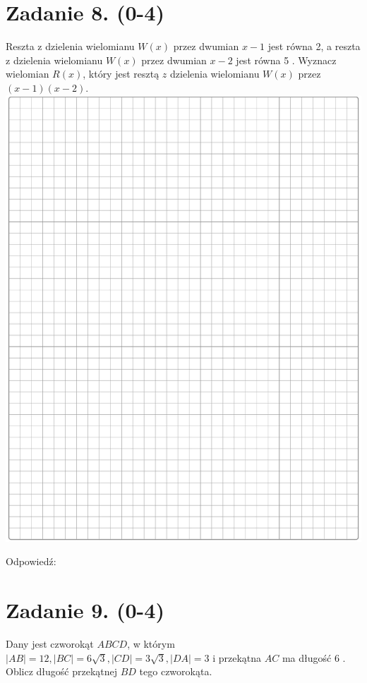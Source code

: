 \documentclass[10pt]{article}
\begin{document}
\section*{Zadanie 8. (0-4)}
Reszta z dzielenia wielomianu \(W(x)\) przez dwumian \(x-1\) jest równa 2, a reszta z dzielenia wielomianu \(W(x)\) przez dwumian \(x-2\) jest równa 5 . Wyznacz wielomian \(R(x)\), który jest resztą \(z\) dzielenia wielomianu \(W(x)\) przez \((x-1)(x-2)\).\\
\includegraphics[max width=\textwidth, center]{2024_11_21_e30d1f37bf0e3631c088g-07}

Odpowiedź: \(\qquad\)

\section*{Zadanie 9. (0-4)}
Dany jest czworokąt \(A B C D\), w którym \(|A B|=12,|B C|=6 \sqrt{3},|C D|=3 \sqrt{3},|D A|=3\) i przekątna \(A C\) ma długość 6 . Oblicz długość przekątnej \(B D\) tego czworokąta.
\end{document}
